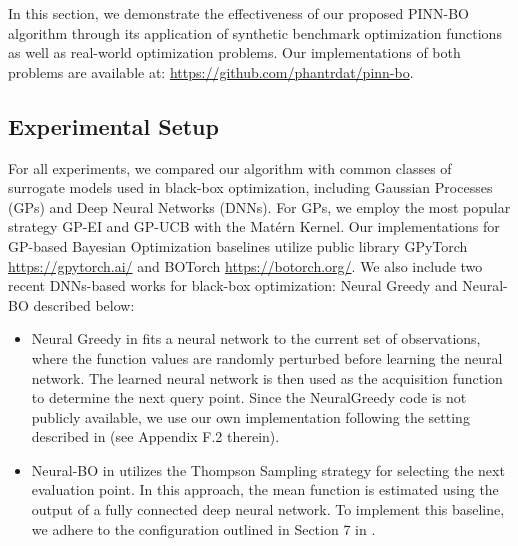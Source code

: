In this section, we demonstrate the effectiveness of our proposed PINN-BO algorithm through its application of synthetic benchmark optimization functions as well as real-world optimization problems. Our implementations of both problems are available at: \url{https://github.com/phantrdat/pinn-bo}.  

\subsection{Experimental Setup}
\label{section:baselines}
For all experiments, we compared our algorithm with common classes of surrogate models used in black-box optimization, including Gaussian Processes (GPs) and Deep Neural Networks (DNNs). For GPs, we employ the most popular strategy GP-EI \citep{mockus1978application} and GP-UCB \citep{srinivas2009gaussian} with the Mat\'ern Kernel. Our implementations for GP-based Bayesian Optimization baselines utilize public library GPyTorch  \url{https://gpytorch.ai/} and BOTorch \url{https://botorch.org/}. We also include two recent DNNs-based works for black-box optimization: Neural Greedy \citep{pariagreedy} and Neural-BO \citep{phan2023neuralbo} described below:
\begin{itemize}
    \item Neural Greedy in \citet{pariagreedy} fits a neural network to the current set of observations, where the function values are randomly perturbed before learning the neural network. The learned neural network is then used as the acquisition function to determine the next query point. Since the NeuralGreedy code is not publicly available, we use our own implementation following the setting described in     \citet{pariagreedy} (see Appendix F.2 therein).
    \item Neural-BO in \citet{phan2023neuralbo} utilizes the Thompson Sampling strategy for selecting the next evaluation point. In this approach, the mean function is estimated using the output of a fully connected deep neural network. To implement this baseline, we adhere to the configuration outlined in Section 7 in \citet{phan2023neuralbo}.
\end{itemize}
